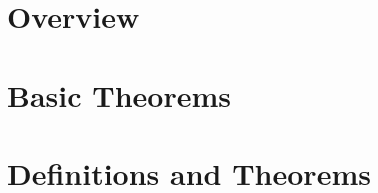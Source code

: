 \section{Overview}

\newpage
\section{Basic Theorems}

\newpage
\section{Definitions and Theorems}

